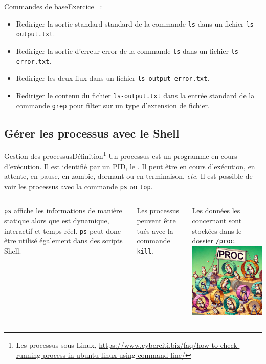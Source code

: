 \documentclass{beamer}
\begin{document}
    \begin{frame}{Commandes de base}{Exercice \execcounterdispinc{}~:}
        \begin{itemize}
            \item Rediriger la sortie standard standard de la commande \lstinline{ls} dans un fichier \lstinline{ls-output.txt}.
            \item Rediriger la sortie d'erreur error de la commande \lstinline{ls} dans un fichier \lstinline{ls-error.txt}.
            \item Rediriger les deux flux dans un fichier \lstinline{ls-output-error.txt}.
            \item Rediriger le contenu du fichier \lstinline{ls-output.txt} dans la entrée standard de la commande \lstinline{grep} pour filter sur un type d'extension de fichier.
        \end{itemize}
    \end{frame}

    \subsection{Gérer les processus avec le Shell}\label{subsec:process-management}

    \begin{frame}{Gestion des processus}{Définition\footnote{\label{process}Les processus sous Linux, \url{https://www.cyberciti.biz/faq/how-to-check-running-process-in-ubuntu-linux-using-command-line/}}}
        Un processus est un programme en cours d'exécution.
        Il est identifié par un PID, le .
        \bigbreak
        Il peut être en cours d'exécution, en attente, en pause, en zombie, dormant ou en terminaison, \textit{etc}.
        Il est possible de voir les processus avec la commande \lstinline{ps} ou \lstinline{top}.
        \bigbreak
        \begin{columns}
            \lstinline{ps} affiche les informations de manière statique alors que est dynamique, interactif et temps réel.
            \lstinline{ps} peut donc être utilisé également dans des scripts Shell.

            Les processus peuvent être tués avec la commande \lstinline{kill}.

            Les données les concernant sont stockées dans le dossier \lstinline{/proc}.
            \centering
            \includegraphics[width=4cm]{image/proc-hamster}
        \end{columns}
    \end{frame}
\end{document}
